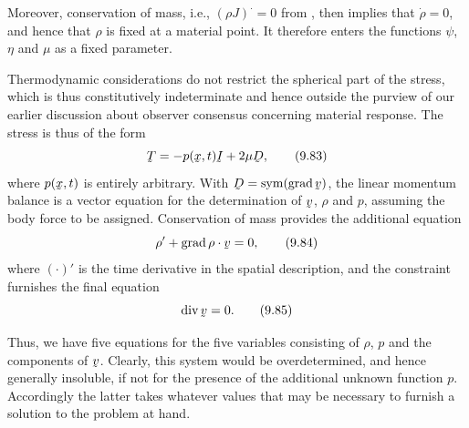 Moreover, conservation of mass, i.e., $(\rho J)^{\textstyle\cdot}=0$
from , then implies that $\dot\rho=0$, and hence that $\rho$
is fixed at a material point. It therefore enters the functions $\psi$,
$\eta$ and $\mu$ as a fixed parameter.

Thermodynamic considerations do not restrict the spherical part of the
stress, which is thus constitutively indeterminate and hence outside the
purview of our earlier discussion about observer consensus concerning
material response. The stress is thus of the form
\begin{equation}
   \bT=-p(\bx,t)\I+2\mu\bD,
   \tag{9.83}\label{eq:9.83}
\end{equation}
where $p(\bx,t)$ is entirely arbitrary. With $\bD=\Sym(\grad\bv)$, the
linear momentum balance is a vector equation for the determination of
$\bv$, $\rho$ and $p$, assuming the body force to be assigned.
Conservation of mass provides the additional equation
\begin{equation}
   \rho'+\ip{\grad\rho}\bv=0,
   \tag{9.84}\label{eq:9.84}
\end{equation}
where $(\cdot)'$ is the time derivative in the spatial description, and
the constraint furnishes the final equation
\begin{equation}
   \dvg\bv=0 .
   \tag{9.85}\label{eq:9.85}
\end{equation}

Thus, we have five equations for the five variables consisting of
$\rho$, $p$ and the components of $\bv$. Clearly, this system would be
overdetermined, and hence generally insoluble, if not for the presence
of the additional unknown function $p$. Accordingly the latter takes
whatever values that may be necessary to furnish a solution to the
problem at hand.


